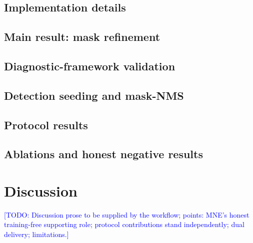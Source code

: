 \documentclass[journal]{IEEEtran}
\newcommand{\HRSIDtodo}[1]{\textcolor{red}{[HRSID: #1]}}
\newcommand{\TODO}[1]{\textcolor{blue}{[TODO: #1]}}
\begin{document}
\subsection{Implementation details}
\subsection{Main result: mask refinement}
\subsection{Diagnostic-framework validation}
\subsection{Detection seeding and mask-NMS}
\subsection{Protocol results}
\subsection{Ablations and honest negative results}

\section{Discussion}
\TODO{Discussion prose to be supplied by the workflow; points: MNE's honest training-free supporting role; protocol contributions stand independently; dual delivery; limitations.}
\end{document}
